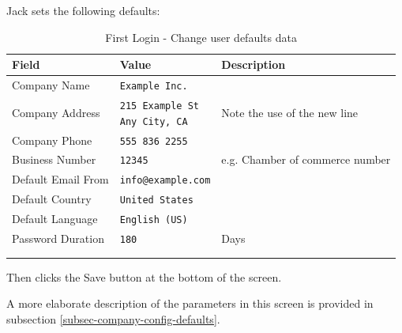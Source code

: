 Jack sets the following defaults:
\begin{longtable}{ llp{6cm} }
        Field & Value & Description \\ \hline
        \endhead
        Company Name & \texttt{Example Inc.} & \\
        Company Address &  \makecell[l]{\texttt{215 Example St} \\  \texttt{Any City, CA}} & Note the use of the new line\\
        Company Phone &  \texttt{555 836 2255} & \\
        Business Number &  \texttt{12345} & e.g. Chamber of commerce number\\
        Default Email From & \texttt{info@example.com} & \\
        Default Country & \texttt{United States}  & \\
        Default Language &  \texttt{English (US)} & \\
        Password Duration &  \texttt{180} & Days\\
        \\
\caption{First Login - Change user defaults data}
\label{fig:first-user-user-default-data}
\end{longtable}


Then clicks the Save button at the bottom of the screen.

A more elaborate description of the parameters in this screen is provided in subsection
\ref{subsec-company-config-defaults}.


